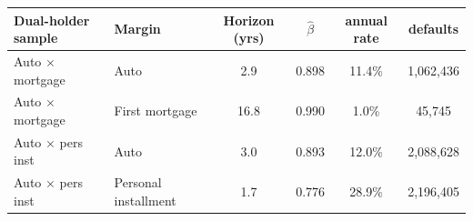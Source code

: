 \begin{tabular}{llcccc}
\toprule
Dual-holder sample & Margin & Horizon (yrs) & $\widehat\beta$ & annual rate & defaults \\
\midrule
Auto $\times$ mortgage & Auto & 2.9 & 0.898 & 11.4\% & 1,062,436 \\
Auto $\times$ mortgage & First mortgage & 16.8 & 0.990 & 1.0\% & 45,745 \\
Auto $\times$ pers inst & Auto & 3.0 & 0.893 & 12.0\% & 2,088,628 \\
Auto $\times$ pers inst & Personal installment & 1.7 & 0.776 & 28.9\% & 2,196,405 \\
\bottomrule
\end{tabular}